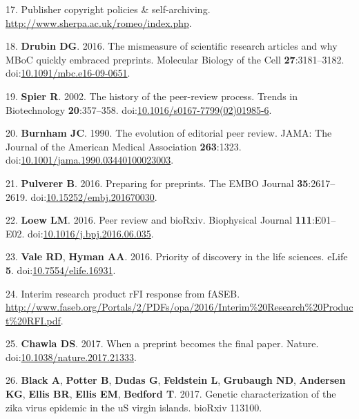 \documentclass[11,]{article}
\begin{document}
17. Publisher copyright policies \& self-archiving.
\url{http://www.sherpa.ac.uk/romeo/index.php}.

18. \textbf{Drubin DG}. 2016. The mismeasure of scientific research
articles and why MBoC quickly embraced preprints. Molecular Biology of
the Cell \textbf{27}:3181--3182.
doi:\href{http://dx.doi.org/10.1091/mbc.e16-09-0651}{10.1091/mbc.e16-09-0651}.

19. \textbf{Spier R}. 2002. The history of the peer-review process.
Trends in Biotechnology \textbf{20}:357--358.
doi:\href{http://dx.doi.org/10.1016/s0167-7799(02)01985-6}{10.1016/s0167-7799(02)01985-6}.

20. \textbf{Burnham JC}. 1990. The evolution of editorial peer review.
JAMA: The Journal of the American Medical Association \textbf{263}:1323.
doi:\href{http://dx.doi.org/10.1001/jama.1990.03440100023003}{10.1001/jama.1990.03440100023003}.

21. \textbf{Pulverer B}. 2016. Preparing for preprints. The EMBO Journal
\textbf{35}:2617--2619.
doi:\href{http://dx.doi.org/10.15252/embj.201670030}{10.15252/embj.201670030}.

22. \textbf{Loew LM}. 2016. Peer review and bioRxiv. Biophysical Journal
\textbf{111}:E01--E02.
doi:\href{http://dx.doi.org/10.1016/j.bpj.2016.06.035}{10.1016/j.bpj.2016.06.035}.

23. \textbf{Vale RD}, \textbf{Hyman AA}. 2016. Priority of discovery in
the life sciences. eLife \textbf{5}.
doi:\href{http://dx.doi.org/10.7554/elife.16931}{10.7554/elife.16931}.

24. Interim research product rFI response from fASEB.
\url{http://www.faseb.org/Portals/2/PDFs/opa/2016/Interim\%20Research\%20Product\%20RFI.pdf}.

25. \textbf{Chawla DS}. 2017. When a preprint becomes the final paper.
Nature.
doi:\href{http://dx.doi.org/10.1038/nature.2017.21333}{10.1038/nature.2017.21333}.

26. \textbf{Black A}, \textbf{Potter B}, \textbf{Dudas G},
\textbf{Feldstein L}, \textbf{Grubaugh ND}, \textbf{Andersen KG},
\textbf{Ellis BR}, \textbf{Ellis EM}, \textbf{Bedford T}. 2017. Genetic
characterization of the zika virus epidemic in the uS virgin islands.
bioRxiv 113100.
\end{document}
